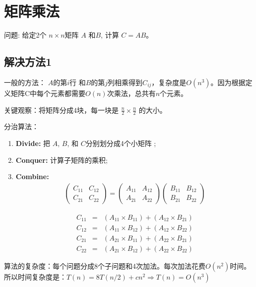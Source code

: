 	
\section{矩阵乘法}
问题: 给定2个 $n \times n $矩阵 $A$ 和$ B$, 计算 $C = AB$。 
\subsection{解决方法1}
	
	一般的方法： $A$的第$i$行 和$ B$的第$j$列相乘得到$C_{ij}$，复杂度是$O(n^3)$。因为根据定义矩阵C中每个元素都需要$O(n)$次乘法，总共有$n$个元素。
	
	关键观察：将矩阵分成4块，每一块是 $\frac{n}{2} \times \frac{n}{2}$ 的大小。
	
	分治算法：
\begin{enumerate}
 \item {\bf Divide:}  把 $A$, $B$, 和 $C$分别划分成4个小矩阵 ; 
 \item {\bf Conquer:}  计算子矩阵的乘积; 
 \item{\bf Combine:} 
\[ 
\begin{matrix}
\begin{pmatrix}
C_{11} & C_{12} \\ 
C_{21} & C_{22} 
\end{pmatrix}
=
\begin{pmatrix}
A_{11} & A_{12} \\ 
A_{21} & A_{22}  
\end{pmatrix}

\begin{pmatrix}
B_{11} & B_{12} \\ 
B_{21} & B_{22}  
 
\end{pmatrix}
    
   \end{matrix}
\]


\begin{eqnarray}
 C_{11} &=& (A_{11}\times B_{11}) + (A_{12} \times B_{21}) \\
C_{12} &=& (A_{11}\times B_{12}) + (A_{12} \times B_{22}) \\
C_{21} &=& (A_{21}\times B_{11}) + (A_{22} \times B_{21}) \\
C_{22} &=& (A_{21}\times B_{12}) + (A_{22} \times B_{22}) 
\end{eqnarray}

 
\end{enumerate}

	算法的复杂度：每个问题分成8个子问题和4次加法。每次加法花费$O(n^2)$时间。
所以时间复杂度是：$T(n)=8T(n/2) + cn^2 \Rightarrow T(n)=O(n^3)$
	
